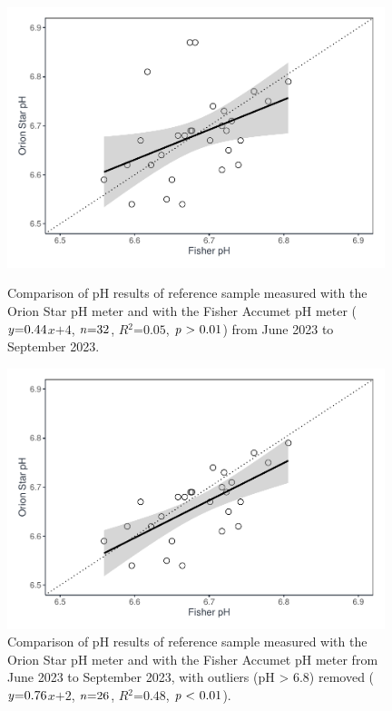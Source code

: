 \documentclass[
]{article}
\begin{document}
\begin{figure}[hb]
  \begin{minipage}[t]{0.48\textwidth}
    \centering
    \includegraphics[width=0.98\textwidth]{ref_comparison.pdf}
    \caption{Comparison of pH results of reference sample measured with the Orion Star pH meter and with the Fisher Accumet pH meter ($\mbox{\textit{y}=0.44}$$\textit{x}$$+$$\mbox{4}$, $\mbox{\textit{n}=32}$, $\textit{R}$$^2$$\mbox{=0.05}$, $\mbox{\textit{p} > 0.01}$) from June 2023 to September 2023.}
  \end{minipage}
  \hfill
  \begin{minipage}[t]{0.48\textwidth}
    \centering
    \includegraphics[width=0.98\textwidth]{ref_comparison_no_outliers.pdf}
    \caption{Comparison of pH results of reference sample measured with the Orion Star pH meter and with the Fisher Accumet pH meter from June 2023 to September 2023, with outliers (pH > 6.8) removed ($\mbox{\textit{y}=0.76}$$\textit{x}$$+$$\mbox{2}$, $\mbox{\textit{n}=26}$, $\textit{R}$$^2$$\mbox{=0.48}$, $\mbox{\textit{p} < 0.01}$).}
  \end{minipage}
\end{figure}
\pagebreak
\end{document}
